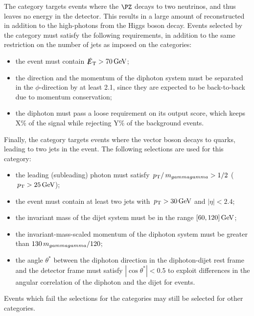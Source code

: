 The \VHMETTag category targets events where the $\PZ$ decays to two neutrinos, and thus leaves no energy in the detector. This results in a large amount of reconstructed \MET in addition to the high-\pT photons from the Higgs boson decay. Events selected by the \VHMETTag category must satisfy the following requirements, in addition to the same restriction on the number of jets as imposed on the \VHLeptonicTag categories:
\begin{itemize}
\item the event must contain $\slashed{E}_{\mathrm{T}} > 70\,\text{Ge\hspace{-.08em}V}$;
\item the \MET direction and the momentum of the diphoton system must be separated in the $\phi$-direction by at least 2.1, since they are expected to be back-to-back due to momentum conservation;
\item the diphoton must pass a loose requirement on its \DiPhoBdt output score, which keeps X\% of the signal while rejecting Y\% of the background events.
\end{itemize}

Finally, the \VHHadronicTag category targets events where the vector boson decays to quarks, leading to two jets in the event. 
The following selections are used for this category:
\begin{itemize}
\item the leading (subleading) photon must satisfy $\,p_\text{T}/\,m_{gammagamma} > 1/2$ ($\,p_\text{T} > 25\,\text{Ge\hspace{-.08em}V}$);
\item the event must contain at least two jets with $\,p_\text{T}>30\,\text{Ge\hspace{-.08em}V}$ and $|\eta|<2.4$;
\item the invariant mass of the dijet system must be in the range $[60,120]\,\text{Ge\hspace{-.08em}V}$;
\item the invariant-mass-scaled momentum of the diphoton system must be greater than $130\,m_{gammagamma}/120$;
\item the angle $\theta^{*}$ between the diphoton direction in the diphoton-dijet rest frame and the detector frame must satisfy $|\cos{\theta^{*}}| <0.5$ to exploit differences in the angular correlation of the diphoton and the dijet for \VH events.
\end{itemize}

Events which fail the selections for the \VHTag categories may still be selected for other categories.

